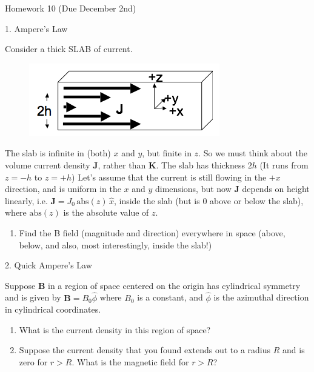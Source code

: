 \documentclass[11pt]{article}
\def\tightlist{}
\begin{document}
{\LARGE Homework 10 (Due December
2nd)}\label{homework-10-due-december-2nd}

{\Large 1. Ampere's Law}\label{amperes-law}

Consider a thick SLAB of current.

\begin{figure}[htbp]
\centering
\includegraphics[width=0.6\linewidth]{./images/hw10/thick_slab.png}
\end{figure}

The slab is infinite in (both) \(x\) and \(y\), but finite in \(z\). So
we must think about the volume current density \(\mathbf{J}\), rather
than \(\mathbf{K}\). The slab has thickness \(2h\) (It runs from
\(z=-h\) to \(z=+h\)) Let's assume that the current is still flowing in
the \(+x\) direction, and is uniform in the \(x\) and \(y\) dimensions,
but now \(\mathbf{J}\) depends on height linearly, i.e.
\(\mathbf{J} = J_0\,\mathrm{abs}(z)\,\hat{x}\), inside the slab (but is
0 above or below the slab), where \(\mathrm{abs}(z)\) is the absolute
value of \(z\).

\begin{enumerate}
\def\labelenumi{\arabic{enumi}.}
\tightlist
\item
  Find the B field (magnitude and direction) everywhere in space (above,
  below, and also, most interestingly, inside the slab!)
\end{enumerate}

{\Large 2. Quick Ampere's Law}\label{quick-amperes-law}

Suppose \(\mathbf{B}\) in a region of space centered on the origin has
cylindrical symmetry and is given by \(\mathbf{B} = B_0\hat{\phi}\)
where \(B_0\) is a constant, and \(\hat{\phi}\) is the azimuthal
direction in cylindrical coordinates.

\begin{enumerate}
\def\labelenumi{\arabic{enumi}.}
\tightlist
\item
  What is the current density in this region of space?
\item
  Suppose the current density that you found extends out to a radius
  \(R\) and is zero for \(r > R\). What is the magnetic field for
  \(r > R\)?
\end{enumerate}
\end{document}
